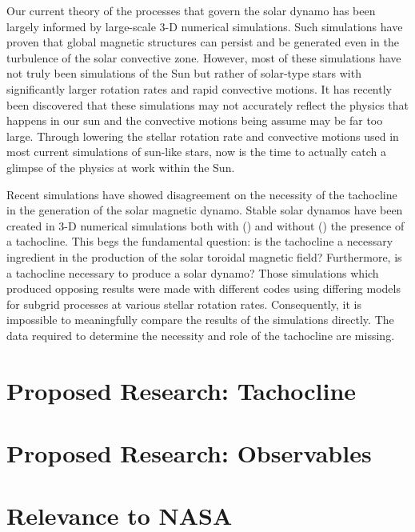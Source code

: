 \documentclass[aasms,12pt]{article}
\begin{document}
Our current theory of the processes that govern the solar dynamo has been
largely informed by large-scale 3-D numerical simulations.  Such simulations
have proven that global magnetic structures can persist and be generated
even in the turbulence of the solar convective zone.  However, most of these
simulations have not truly been simulations of the Sun but rather of solar-type
stars with significantly larger rotation rates and rapid convective motions.  
It has recently been discovered
that these simulations may not accurately reflect the physics that happens
in our sun and the convective motions being assume may be far too large.
Through lowering the stellar rotation rate and convective motions used in
most current simulations of sun-like stars, now is the time to actually catch
a glimpse of the physics at work within the Sun. 

Recent simulations have showed disagreement on the necessity of the tachocline
in the generation of the solar magnetic dynamo.  Stable solar dynamos have been
created in 3-D numerical simulations both with 
(\citealt{ghizaru2010, racine2011})
and without (\citealt{brown2011, nelson2013}) the presence of a tachocline. This
begs the fundamental question: is the tachocline a necessary ingredient in the
production of the solar toroidal magnetic field?  Furthermore, is a tachocline
necessary to produce a solar dynamo?  Those simulations which produced opposing
results were made with different codes using differing models for subgrid
processes at various stellar rotation rates.  Consequently, it is impossible to
meaningfully compare the results of the simulations directly.  The data required
to determine the necessity and role of the tachocline are missing.

\section{Proposed Research: Tachocline}






\section{Proposed Research: Observables}




\section{Relevance to NASA} 
\end{document}
